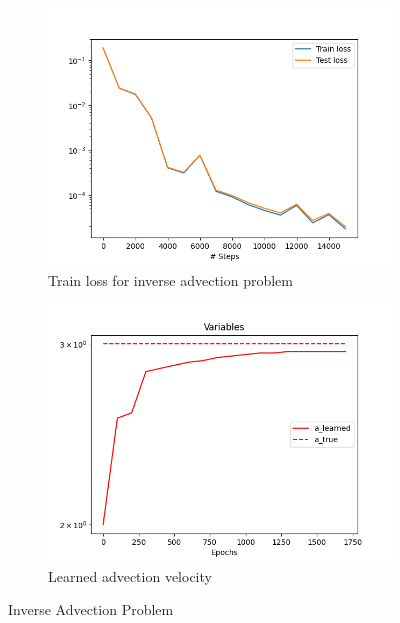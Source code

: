 \documentclass[letterpaper,11pt]{article}
\begin{document}
    \begin{figure}[h]
        \centering
        \begin{subfigure}{0.45\textwidth}
            \includegraphics*[width=\textwidth]{advection_inverse_train_loss.png}
            \caption{Train loss for inverse advection problem}
        \end{subfigure}
        \hfill
        \begin{subfigure}{0.45\textwidth}
            \includegraphics*[width=\textwidth]{advection_inverse_learned_advection_velocity.png}
            \caption{Learned advection velocity}
        \end{subfigure}
        \caption{Inverse Advection Problem}
    \end{figure}
\end{document}
